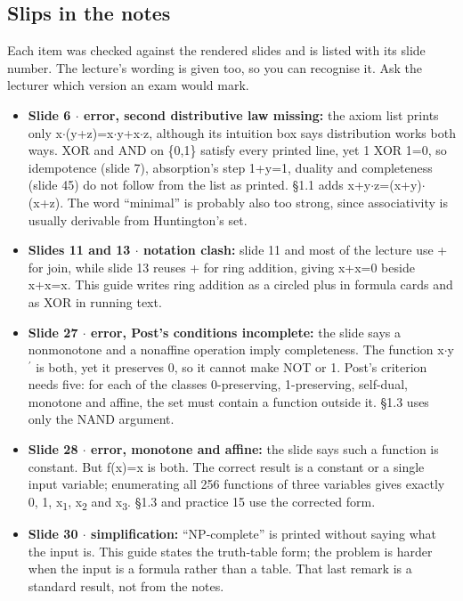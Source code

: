 \documentclass[11pt]{article}
\begin{document}
\begin{keepsection}
\section{Slips in the notes}

Each item was checked against the rendered slides and is listed with its slide number. The lecture’s wording is given too, so you can recognise it. Ask the lecturer which version an exam would mark.

\begin{itemize}
\item \textbf{Slide 6 \ensuremath{\cdot} error, second distributive law missing:} the axiom list prints only x\ensuremath{\cdot}(y+z)=x\ensuremath{\cdot}y+x\ensuremath{\cdot}z, although its intuition box says distribution works both ways. XOR and AND on \{0,1\} satisfy every printed line, yet 1 XOR 1=0, so idempotence (slide 7), absorption’s step 1+y=1, duality and completeness (slide 45) do not follow from the list as printed. §1.1 adds x+y\ensuremath{\cdot}z=(x+y)\ensuremath{\cdot}(x+z). The word “minimal” is probably also too strong, since associativity is usually derivable from Huntington’s set.
\item \textbf{Slides 11 and 13 \ensuremath{\cdot} notation clash:} slide 11 and most of the lecture use + for join, while slide 13 reuses + for ring addition, giving x+x=0 beside x+x=x. This guide writes ring addition as a circled plus in formula cards and as XOR in running text.
\item \textbf{Slide 27 \ensuremath{\cdot} error, Post’s conditions incomplete:} the slide says a nonmonotone and a nonaffine operation imply completeness. The function x\ensuremath{\cdot}y\ensuremath{{}^{\prime}} is both, yet it preserves 0, so it cannot make NOT or 1. Post’s criterion needs five: for each of the classes 0-preserving, 1-preserving, self-dual, monotone and affine, the set must contain a function outside it. §1.3 uses only the NAND argument.
\item \textbf{Slide 28 \ensuremath{\cdot} error, monotone and affine:} the slide says such a function is constant. But f(x)=x is both. The correct result is a constant or a single input variable; enumerating all 256 functions of three variables gives exactly 0, 1, x\textsubscript{1}, x\textsubscript{2} and x\textsubscript{3}. §1.3 and practice 15 use the corrected form.
\item \textbf{Slide 30 \ensuremath{\cdot} simplification:} “NP-complete” is printed without saying what the input is. This guide states the truth-table form; the problem is harder when the input is a formula rather than a table. That last remark is a standard result, not from the notes.

\end{itemize}
\end{keepsection}
\end{document}
